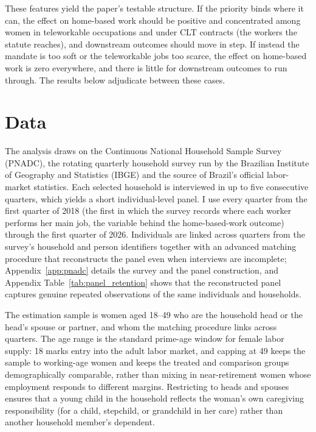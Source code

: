 \documentclass[12pt]{article}
\begin{document}
These features yield the paper's testable structure. If the priority binds where it can, the effect on home-based work should be positive and concentrated among women in teleworkable occupations and under CLT contracts (the workers the statute reaches), and downstream outcomes should move in step. If instead the mandate is too soft or the teleworkable jobs too scarce, the effect on home-based work is zero everywhere, and there is little for downstream outcomes to run through. The results below adjudicate between these cases.

\section{Data}\label{sec:data}

The analysis draws on the Continuous National Household Sample Survey (PNADC), the rotating quarterly household survey run by the Brazilian Institute of Geography and Statistics (IBGE) and the source of Brazil's official labor-market statistics. Each selected household is interviewed in up to five consecutive quarters, which yields a short individual-level panel. I use every quarter from the first quarter of 2018 (the first in which the survey records where each worker performs her main job, the variable behind the home-based-work outcome) through the first quarter of 2026. Individuals are linked across quarters from the survey's household and person identifiers together with an advanced matching procedure that reconstructs the panel even when interviews are incomplete; Appendix~\ref{app:pnadc} details the survey and the panel construction, and Appendix Table~\ref{tab:panel_retention} shows that the reconstructed panel captures genuine repeated observations of the same individuals and households.

The estimation sample is women aged 18--49 who are the household head or the head's spouse or partner, and whom the matching procedure links across quarters. The age range is the standard prime-age window for female labor supply: 18 marks entry into the adult labor market, and capping at 49 keeps the sample to working-age women and keeps the treated and comparison groups demographically comparable, rather than mixing in near-retirement women whose employment responds to different margins. Restricting to heads and spouses ensures that a young child in the household reflects the woman's own caregiving responsibility (for a child, stepchild, or grandchild in her care) rather than another household member's dependent.
\end{document}
